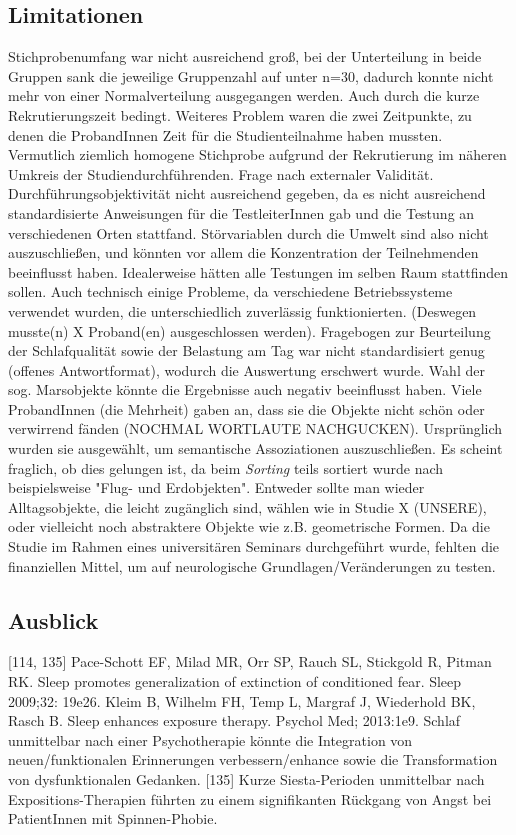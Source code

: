 \subsection{Limitationen}
Stichprobenumfang war nicht ausreichend groß, bei der Unterteilung in beide Gruppen sank die jeweilige Gruppenzahl auf unter n=30, dadurch konnte nicht mehr von einer Normalverteilung ausgegangen werden. Auch durch die kurze Rekrutierungszeit bedingt. Weiteres Problem waren die zwei Zeitpunkte, zu denen die ProbandInnen Zeit für die Studienteilnahme haben mussten.
Vermutlich ziemlich homogene Stichprobe aufgrund der Rekrutierung im näheren Umkreis der Studiendurchführenden.
Frage nach externaler Validität.
Durchführungsobjektivität nicht ausreichend gegeben, da es nicht ausreichend standardisierte Anweisungen für die TestleiterInnen gab und die Testung an verschiedenen Orten stattfand. Störvariablen durch die Umwelt sind also nicht auszuschließen, und könnten vor allem die Konzentration der Teilnehmenden beeinflusst haben. Idealerweise hätten alle Testungen im selben Raum stattfinden sollen.
Auch technisch einige Probleme, da verschiedene Betriebssysteme verwendet wurden, die unterschiedlich zuverlässig funktionierten. (Deswegen musste(n) X Proband(en) ausgeschlossen werden).
Fragebogen zur Beurteilung der Schlafqualität sowie der Belastung am Tag war nicht standardisiert genug (offenes Antwortformat), wodurch die Auswertung erschwert wurde.
Wahl der sog. Marsobjekte könnte die Ergebnisse auch negativ beeinflusst haben. Viele ProbandInnen (die Mehrheit) gaben an, dass sie die Objekte nicht schön oder verwirrend fänden (NOCHMAL WORTLAUTE NACHGUCKEN). Ursprünglich wurden sie ausgewählt, um semantische Assoziationen auszuschließen. Es scheint fraglich, ob dies gelungen ist, da beim \textit{Sorting} teils sortiert wurde nach beispielsweise "Flug- und Erdobjekten". Entweder sollte man wieder Alltagsobjekte, die leicht zugänglich sind, wählen wie in Studie X (UNSERE), oder vielleicht noch abstraktere Objekte wie z.B. geometrische Formen.
Da die Studie im Rahmen eines universitären Seminars durchgeführt wurde, fehlten die finanziellen Mittel, um auf neurologische Grundlagen/Veränderungen zu testen.

\subsection{Ausblick}
[114, 135]
Pace-Schott EF, Milad MR, Orr SP, Rauch SL, Stickgold R, Pitman RK. Sleep promotes generalization of extinction of conditioned fear. Sleep 2009;32: 19e26.
Kleim B, Wilhelm FH, Temp L, Margraf J, Wiederhold BK, Rasch B. Sleep enhances exposure therapy. Psychol Med; 2013:1e9.
Schlaf unmittelbar nach einer Psychotherapie könnte die Integration von neuen/funktionalen Erinnerungen verbessern/enhance sowie die Transformation von dysfunktionalen Gedanken.
[135] Kurze Siesta-Perioden unmittelbar nach Expositions-Therapien führten zu einem signifikanten Rückgang von Angst bei PatientInnen mit Spinnen-Phobie.


